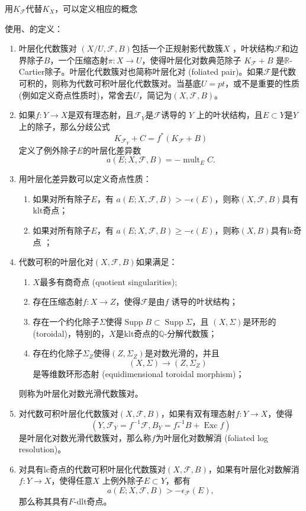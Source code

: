 用$K_{\mathcal{F}}$代替$K_{X}$，可以定义相应的概念
\begin{definition}
使用\cite[3.4.5,6.2.1]{chlx}、\cite[3.2]{acss}的定义：
  \begin{enumerate}
    \item 叶层化代数簇对 $(X/U,\mathcal{F},B)$包括一个正规射影代数簇$X$ ，叶状结构$\mathcal{F}$和边界除子$B$，一个压缩态射$\pi:X\to U$，使得叶层化对数典范除子 $ K_{\mathcal{F}}+B $ 是$\mathbb{R}$-Cartier除子。叶层化代数簇对也简称叶层化对 (foliated pair)。如果$\mathcal{F}$是代数可积的，则称为代数可积叶层化代数簇对。当基底$U=pt$，或不是重要的性质 (例如定义奇点性质时)，常舍去$U$，简记为$(X,\mathcal{F},B)$。 
    \item 如果$f:Y\to X$是双有理态射，且$\mathcal{F}_{Y} $是$\mathcal{F} $诱导的 $Y$ 上的叶状结构，且$E \subset Y$是$Y$ 上的除子，那么分歧公式
  \[ K_{\mathcal{F}_{Y}}+C=f^{*}(K_{\mathcal{F}}+B) \]
  定义了例外除子$E$的叶层化差异数
  \[ a(E;X,\mathcal{F},B)=- \operatorname{mult}_{E}C .\]
    \item 用叶层化差异数可以定义奇点性质：
      \begin{enumerate}
        \item 如果对所有除子$E$，有 $a(E;X,\mathcal{F},B)>-\epsilon(E)$，则称$(X,\mathcal{F},B) $具有klt奇点；
        \item 如果对所有除子$E$，有 $a(E;X,\mathcal{F},B)\geqslant -\epsilon(E)$，则称$(X,B) $具有lc奇点 ；
      \end{enumerate}
    \item 代数可积的叶层化对$(X,\mathcal{F},B)$如果满足：
      \begin{enumerate}
        \item $X$最多有商奇点 (quotient singularities);
        \item 存在压缩态射$f:X\to Z$，使得$\mathcal{F}$是由$f$ 诱导的叶状结构； 
        \item 存在一个约化除子$\Sigma$使得$\operatorname{Supp}B \subset \operatorname{Supp} \Sigma $，且 $(X,\Sigma)$是环形的 (toroidal)，特别的，$X$是klt奇点的$\mathbb{Q}$-分解代数簇；
        \item 存在约化除子$\Sigma_{Z}$使得$ (Z,\Sigma_{Z})$是对数光滑的，并且
          \[ (X,\Sigma)\to (Z,\Sigma_{Z}) \]
          是等维数环形态射 (equidimensional toroidal morphism)；
      \end{enumerate}
      则称为叶层化对数光滑代数簇对。
    \item 对代数可积叶层化代数簇对$(X,\mathcal{F},B)$，如果有双有理态射$f:Y\to X$，使得
      \[ (Y,\mathcal{F}_{Y}=f^{-1}\mathcal{F},B_{Y}=f^{-1}_{*}B+ \operatorname{Exc}f) \]
      是叶层化对数光滑代数簇对，那么称$f$为叶层化对数解消 (foliated log resolution)。
    \item 对具有lc奇点的代数可积叶层化代数簇对$(X,\mathcal{F},B)$，如果有叶层化对数解消$f:Y\to X$，使得任意$X$ 上例外除子$E \subset Y$，都有
      \[ a(E;X,\mathcal{F},B)>-\epsilon_{\mathcal{F}}(E) ,\]
      那么称其具有$F$-dlt奇点。
  \end{enumerate}
\end{definition}
